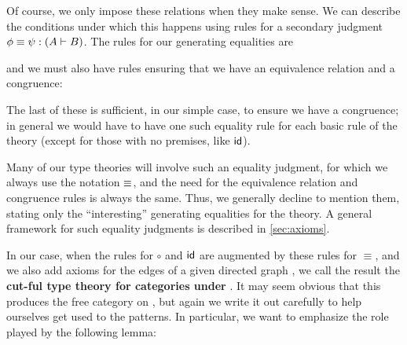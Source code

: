 Of course, we only impose these relations when they make sense.
We can describe the conditions under which this happens using rules for a secondary judgment $\phi\equiv \psi : (A\vdash B)$.
The rules for our generating equalities are
and we must also have rules ensuring that we have an equivalence relation and a congruence:
The last of these is sufficient, in our simple case, to ensure we have a congruence; in general we would have to have one such equality rule for each basic rule of the theory (except for those with no premises, like $\mathsf{id}$).

Many of our type theories will involve such an equality judgment, for which we always use the notation $\mathord{\equiv}$, and the need for the equivalence relation and congruence rules is always the same.
Thus, we generally decline to mention them, stating only the ``interesting'' generating equalities for the theory.
A general framework for such equality judgments is described in \cref{sec:axioms}.

In our case, when the rules for $\circ$ and $\mathsf{id}$ are augmented by these rules for $\equiv$, and we also add axioms for the edges of a given directed graph \cG, we call the result the \textbf{cut-ful type theory for categories under \cG}.
It may seem obvious that this produces the free category on \cG, but again we write it out carefully to help ourselves get used to the patterns.
In particular, we want to emphasize the role played by the following lemma:

